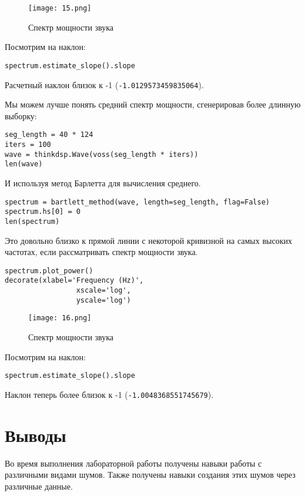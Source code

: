 \documentclass[a4paper,12pt]{report}
\begin{document}
\begin{figure}[H]
        \centering
        \texttt{[image: 15.png]}
        \caption{Спектр мощности звука}
        \label{fig:lab4_fig5_2}
\end{figure}

Посмотрим на наклон:

\begin{lstlisting}[caption=Наклон прямой]
spectrum.estimate_slope().slope
\end{lstlisting}

Расчетный наклон близок к -1 (\texttt{-1.0129573459835064}).

Мы можем лучше понять средний спектр мощности, сгенерировав более длинную выборку:

\begin{lstlisting}[caption=Генерация более длинной выборки]
seg_length = 40 * 124
iters = 100
wave = thinkdsp.Wave(voss(seg_length * iters))
len(wave)
\end{lstlisting}

И используя метод Барлетта для вычисления среднего.

\begin{lstlisting}[caption=Использование метода Барлетта]
spectrum = bartlett_method(wave, length=seg_length, flag=False)
spectrum.hs[0] = 0
len(spectrum)
\end{lstlisting}

Это довольно близко к прямой линии с некоторой кривизной на самых высоких частотах, если рассматривать спектр мощности звука.

\begin{lstlisting}[caption=Спектр мощности звука]
spectrum.plot_power()
decorate(xlabel='Frequency (Hz)',
                 xscale='log', 
                 yscale='log')
\end{lstlisting}

\begin{figure}[H]
        \centering
        \texttt{[image: 16.png]}
        \caption{Спектр мощности звука}
        \label{fig:lab4_fig5_3}
\end{figure}

Посмотрим на наклон:

\begin{lstlisting}[caption=Наклон прямой]
spectrum.estimate_slope().slope
\end{lstlisting}

Наклон теперь более близок к -1 (\texttt{-1.0048368551745679}).

\chapter{Выводы}

Во время выполнения лабораторной работы получены навыки работы с различными видами шумов. Также получены навыки создания этих шумов через различные данные.
\end{document}
